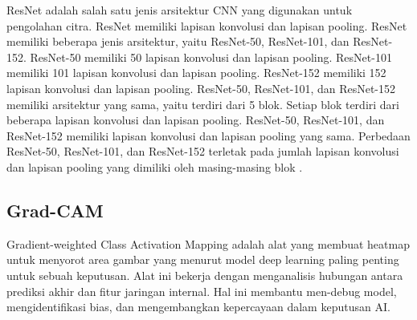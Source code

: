 ResNet adalah salah satu jenis arsitektur CNN yang digunakan untuk pengolahan citra. ResNet memiliki lapisan konvolusi dan lapisan pooling. ResNet memiliki beberapa jenis arsitektur, yaitu ResNet-50, ResNet-101, dan ResNet-152. ResNet-50 memiliki 50 lapisan konvolusi dan lapisan pooling. ResNet-101 memiliki 101 lapisan konvolusi dan lapisan pooling. ResNet-152 memiliki 152 lapisan konvolusi dan lapisan pooling. ResNet-50, ResNet-101, dan ResNet-152 memiliki arsitektur yang sama, yaitu terdiri dari 5 blok. Setiap blok terdiri dari beberapa lapisan konvolusi dan lapisan pooling. ResNet-50, ResNet-101, dan ResNet-152 memiliki lapisan konvolusi dan lapisan pooling yang sama. Perbedaan ResNet-50, ResNet-101, dan ResNet-152 terletak pada jumlah lapisan konvolusi dan lapisan pooling yang dimiliki oleh masing-masing blok \parencite{He2016}.

\subsection{Grad-CAM}
Gradient-weighted Class Activation Mapping adalah alat yang membuat heatmap untuk menyorot area gambar yang menurut model deep learning paling penting untuk sebuah keputusan. Alat ini bekerja dengan menganalisis hubungan antara prediksi akhir dan fitur jaringan internal. Hal ini membantu men-debug model, mengidentifikasi bias, dan mengembangkan kepercayaan dalam keputusan AI.




